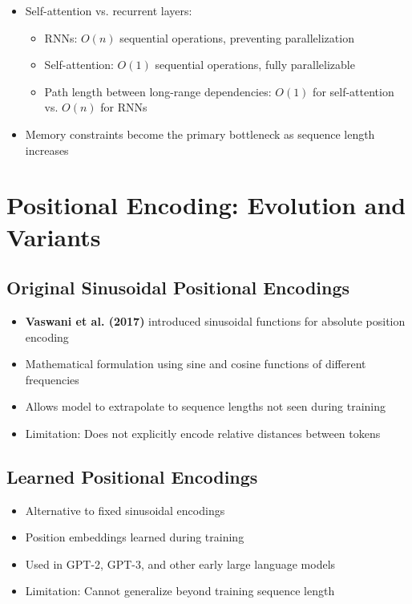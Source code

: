 \documentclass[11pt,letterpaper]{article}
\begin{document}
\begin{itemize}[leftmargin=*]
    \item Self-attention vs. recurrent layers:
    \begin{itemize}
        \item RNNs: $O(n)$ sequential operations, preventing parallelization
        \item Self-attention: $O(1)$ sequential operations, fully parallelizable
        \item Path length between long-range dependencies: $O(1)$ for self-attention vs. $O(n)$ for RNNs
    \end{itemize}

    \item Memory constraints become the primary bottleneck as sequence length increases
\end{itemize}

\section{Positional Encoding: Evolution and Variants}

\subsection{Original Sinusoidal Positional Encodings}

\begin{itemize}[leftmargin=*]
    \item \textbf{Vaswani et al. (2017)} introduced sinusoidal functions for absolute position encoding
    \item Mathematical formulation using sine and cosine functions of different frequencies
    \item Allows model to extrapolate to sequence lengths not seen during training
    \item Limitation: Does not explicitly encode relative distances between tokens
\end{itemize}

\subsection{Learned Positional Encodings}

\begin{itemize}[leftmargin=*]
    \item Alternative to fixed sinusoidal encodings
    \item Position embeddings learned during training
    \item Used in GPT-2, GPT-3, and other early large language models
    \item Limitation: Cannot generalize beyond training sequence length
\end{itemize}
\end{document}
